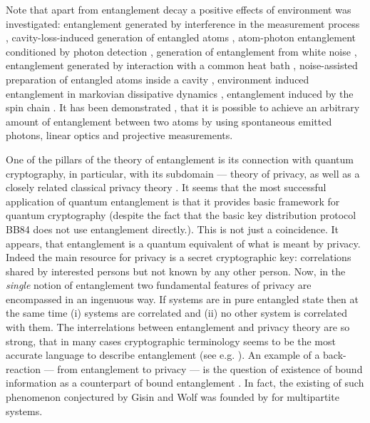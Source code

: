 \documentclass[rmp,12pt,preprint]{revtex4-2}
\begin{document}
Note that apart from entanglement decay
a positive effects of environment was investigated: entanglement generated by interference in the measurement process
\cite {CabrilloCGZ1999,BoseKPV1999}, cavity-loss-induced generation of entangled atoms \cite {PlenioHBK1999}, atom-photon entanglement conditioned by photon detection  \cite {Horodecki2001}, generation of entanglement from white noise \cite{PlenioH2002}, entanglement generated by interaction with a common heat bath \cite{Braun2002}, noise-assisted preparation of entangled atoms inside a cavity \cite{YuYZS2003}, environment induced entanglement in markovian dissipative dynamics \cite {BenattiFP2003}, entanglement induced by the spin chain \cite {YiCW2006}. It has been demonstrated \cite{LamataGC2007}, that
it is possible to achieve an arbitrary amount of entanglement between two atoms by using spontaneous emitted photons, linear optics and projective measurements.


One of the pillars of the theory of entanglement is its connection
with quantum cryptography, in particular, with its subdomain ---
theory of privacy, as well as a closely related classical privacy
theory \cite{GisinWolf_QKAvsCKA,GisinWolf_linking,Collins-Popescu}. It
seems that the most successful application of quantum entanglement is
that it provides basic framework for quantum cryptography (despite the
fact that the basic key distribution protocol BB84 does not use
entanglement directly.). This is not just a coincidence. It appears,
that entanglement is a quantum equivalent of what is meant by privacy.
Indeed the main resource for privacy is a secret cryptographic key:
correlations shared by interested persons but not known by any other
person. Now, in the {\it single} notion of entanglement two
fundamental features of privacy are encompassed in an ingenuous
way. If systems are in pure entangled state then at the same time (i)
systems are correlated and (ii) no other system is correlated with
them. The interrelations between entanglement and privacy theory are
so strong, that in many cases cryptographic terminology seems to be
the most accurate language to describe entanglement (see e.g.
\cite{DevetakWinter-hash}). An example of a back-reaction --- from
entanglement to privacy --- is the question of existence of bound
information as a counterpart of bound entanglement
\cite{GisinWolf_linking}. In fact, the existing of such phenomenon
conjectured by Gisin and Wolf was founded by \cite
{AcinCM-MultiBoundInfo} for multipartite systems.
\end{document}

